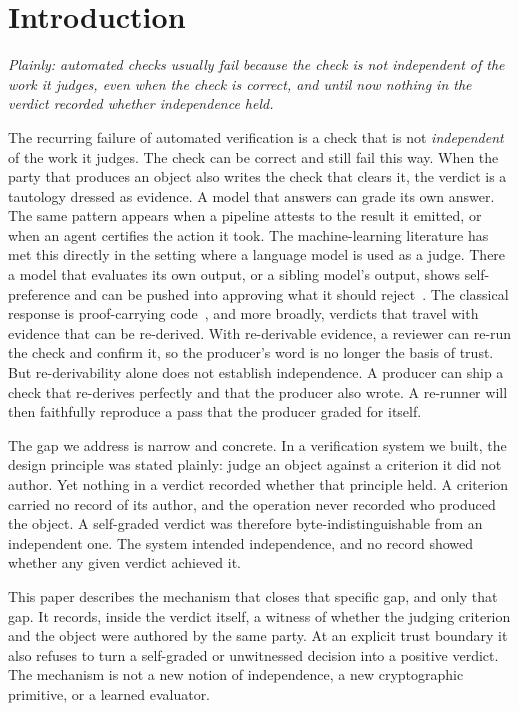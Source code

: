 \documentclass[11pt]{article}
\begin{document}
\section{Introduction}
\emph{Plainly: automated checks usually fail because the check is not independent of the work it judges, even when the check is correct, and until now nothing in the verdict recorded whether independence held.}

The recurring failure of automated verification is a check that is not \emph{independent} of the work it judges. The check can be correct and still fail this way. When the party that produces an object also writes the check that clears it, the verdict is a tautology dressed as evidence. A model that answers can grade its own answer. The same pattern appears when a pipeline attests to the result it emitted, or when an agent certifies the action it took. The machine-learning literature has met this directly in the setting where a language model is used as a judge. There a model that evaluates its own output, or a sibling model's output, shows self-preference and can be pushed into approving what it should reject~\cite{llmjudge}. The classical response is proof-carrying code~\cite{pcc}, and more broadly, verdicts that travel with evidence that can be re-derived. With re-derivable evidence, a reviewer can re-run the check and confirm it, so the producer's word is no longer the basis of trust. But re-derivability alone does not establish independence. A producer can ship a check that re-derives perfectly and that the producer also wrote. A re-runner will then faithfully reproduce a pass that the producer graded for itself.

The gap we address is narrow and concrete. In a verification system we built, the design principle was stated plainly: judge an object against a criterion it did not author. Yet nothing in a verdict recorded whether that principle held. A criterion carried no record of its author, and the operation never recorded who produced the object. A self-graded verdict was therefore byte-indistinguishable from an independent one. The system intended independence, and no record showed whether any given verdict achieved it.

This paper describes the mechanism that closes that specific gap, and only that gap. It records, inside the verdict itself, a witness of whether the judging criterion and the object were authored by the same party. At an explicit trust boundary it also refuses to turn a self-graded or unwitnessed decision into a positive verdict. The mechanism is not a new notion of independence, a new cryptographic primitive, or a learned evaluator.
\end{document}
